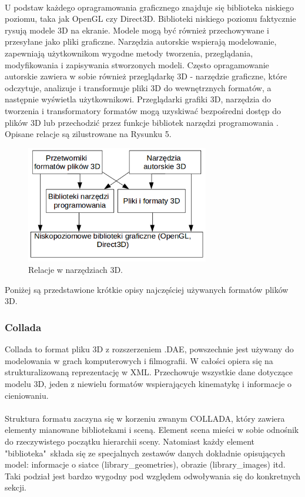 \paragraph{}
U podstaw każdego opragramowania graficznego znajduje się biblioteka niskiego poziomu, taka jak OpenGL czy Direct3D. Biblioteki niskiego poziomu faktycznie rysują modele 3D na ekranie. Modele mogą być również przechowywane i przesyłane jako pliki graficzne. Narzędzia autorskie wspierają modelowanie, zapewniają użytkownikom wygodne metody tworzenia, przeglądania, modyfikowania i zapisywania stworzonych modeli. Często opragamowanie autorskie zawiera w sobie również przeglądarkę 3D - narzędzie graficzne, które odczytuje, analizuje i transformuje pliki 3D do wewnętrznych formatów, a następnie wyświetla użytkownikowi. Przeglądarki grafiki 3D, narzędzia do tworzenia i transformatory formatów mogą uzyskiwać bezpośredni dostęp do plików 3D lub przechodzić przez funkcje bibliotek narzędzi programowania \cite{formatsinfo}. Opisane relacje są zilustrowane na Rysunku 5.
\begin{figure}[H]
		\centering
 		\includegraphics[width=8.0cm]{relacje.png}
    	\caption{Relacje w narzędziach 3D.}
 		\label{rys5}
\end{figure}
Poniżej są przedstawione krótkie opisy najczęściej używanych formatów plików 3D. %

\subsubsection{Collada}
Collada to format pliku 3D z rozszerzeniem .DAE, powszechnie jest używany do modelowania w grach komputerowych i filmografii. W całości opiera się na strukturalizowaną reprezentację w XML. Przechowuje wszystkie dane dotyczące modelu 3D, jeden z niewielu formatów wspierających kinematykę i informacje o cieniowaniu. \paragraph{}
Struktura formatu zaczyna się w korzeniu zwanym COLLADA, który zawiera elementy mianowane bibliotekami i sceną. Element scena mieści w sobie odnośnik do rzeczywistego początku hierarchii sceny. Natomiast każdy element "biblioteka"\ składa się ze specjalnych zestawów danych dokładnie opisujących model: informacje o siatce (library\_geometries), obrazie (library\_images) itd. Taki podział jest bardzo wygodny pod względem odwoływania się do konkretnych sekcji.  

